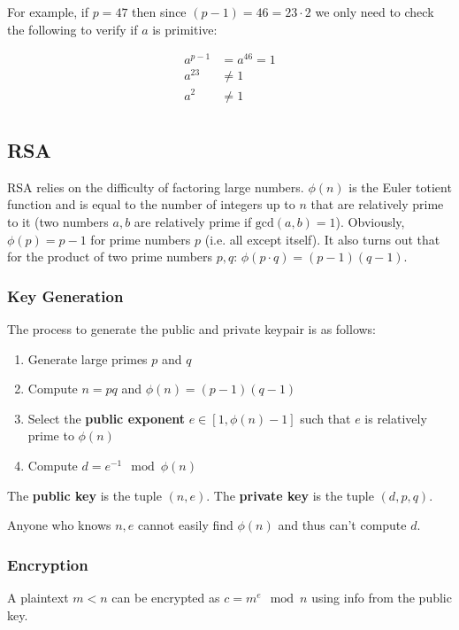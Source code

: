 \documentclass[11pt]{report}
\begin{document}
For example, if $p=47$ then since $(p-1) = 46 = 23\cdot2$ we only need to check the following to verify if $a$ is primitive:

\begin{align*}
	a^{p-1} &= a^{46} = 1\\
	a^{23} &\neq 1\\
	a^2 &\neq 1\\
\end{align*}

\subsection{RSA}
RSA relies on the difficulty of factoring large numbers. $\phi(n)$ is the Euler totient function and is equal to the number of integers up to $n$ that are relatively prime to it (two numbers $a, b$ are relatively prime if $\text{gcd}(a,b) = 1$). Obviously, $\phi(p) = p-1$ for prime numbers $p$ (i.e. all except itself). It also turns out that for the product of two prime numbers $p, q$: $\phi(p\cdot q) = (p-1)(q-1)$.

\subsubsection{Key Generation}

The process to generate the public and private keypair is as follows:

\begin{enumerate}
	\item Generate large primes $p$ and $q$
	\item Compute $n = pq$ and $\phi(n) = (p-1)(q-1)$
	\item Select the \textbf{public exponent} $e \in [1, \phi(n)-1]$ such that $e$ is relatively prime to $\phi(n)$
	\item Compute $d = e^{-1} \mod{\phi(n)}$
\end{enumerate}

The \textbf{public key} is the tuple $(n, e)$. The \textbf{private key} is the tuple $(d, p, q)$.

Anyone who knows $n, e$ cannot easily find $\phi(n)$ and thus can't compute $d$.

\subsubsection{Encryption}
A plaintext $m < n$ can be encrypted as $c = m^e \mod{n}$ using info from the public key.
\end{document}
